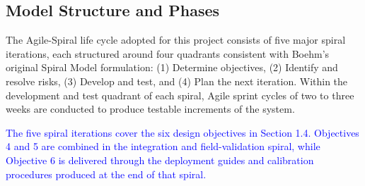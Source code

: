 \documentclass[12pt,a4paper,oneside]{memoir}
\newcommand{\earlierrevision}[1]{\textcolor{blue}{#1}}
\begin{document}
\subsection{Model Structure and Phases}

The Agile-Spiral life cycle adopted for this project consists of five major spiral iterations, each structured around four quadrants consistent with Boehm's original Spiral Model formulation: (1) Determine objectives, (2) Identify and resolve risks, (3) Develop and test, and (4) Plan the next iteration. Within the development and test quadrant of each spiral, Agile sprint cycles of two to three weeks are conducted to produce testable increments of the system.

\earlierrevision{The five spiral iterations cover the six design objectives in Section 1.4. Objectives 4 and 5 are combined in the integration and field-validation spiral, while Objective 6 is delivered through the deployment guides and calibration procedures produced at the end of that spiral.}
\end{document}
